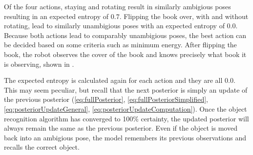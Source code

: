         Of the four actions, staying and rotating result in similarly ambigious poses resulting in an expected entropy of $0.7$. Flipping the book over, with and without rotating, lead to similarly unambigious poses with an expected entropy of $0.0$. Because both actions lead to comparably unambigious poses, the best action can be decided based on some criteria such as minimum energy. After flipping the book, the robot observes the cover of the book and knows precisely what book it is observing, shown in .

        The expected entropy is calculated again for each action and they are all $0.0$. This may seem peculiar, but recall that the next posterior is simply an update of the previous posterior (\eqref{eq:fullPosterior}, \eqref{eq:fullPosteriorSimplified}, \eqref{eq:posteriorUpdateGeneral}, \eqref{eq:posteriorUpdateComputation}). Once the object recognition algorithm has converged to 100\% certainty, the updated posterior will always remain the same as the previous posterior. Even if the object is moved back into an ambigious pose, the model remembers its previous observations and recalls the correct object. 

